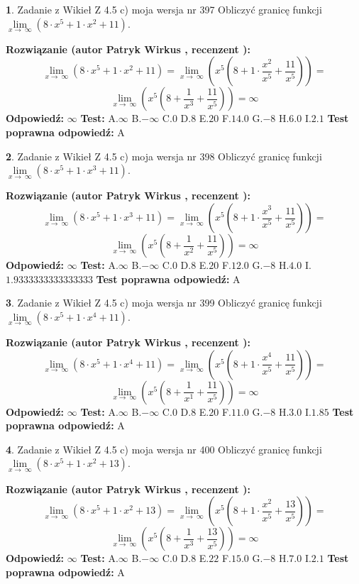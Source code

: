 \documentclass[12pt, a4paper]{article}
\theoremstyle{definition} %
\newtheorem{zad}{}
\newcommand{\zadStart}[1]{\begin{zad}#1\newline}
\newcommand{\zadStop}{\end{zad}}
\newcommand{\rozwStart}[2]{\noindent \textbf{Rozwiązanie (autor #1 , recenzent #2): }\newline}
\newcommand{\rozwStop}{\newline}
\newcommand{\odpStart}{\noindent \textbf{Odpowiedź:}\newline}
\newcommand{\odpStop}{\newline}
\newcommand{\testStart}{\noindent \textbf{Test:}\newline}
\newcommand{\testStop}{\newline}
\newcommand{\kluczStart}{\noindent \textbf{Test poprawna odpowiedź:}\newline}
\newcommand{\kluczStop}{\newline}
\begin{document}
\zadStart{Zadanie z Wikieł Z 4.5 c) moja wersja nr 397}
Obliczyć granicę funkcji  $\lim\limits_{x\to\ \infty}(8 \cdot x^{5}+1 \cdot x^{2}+11)$.
\zadStop
\rozwStart{Patryk Wirkus}{}
$$\lim\limits_{x\to\ \infty}(8 \cdot x^{5}+1 \cdot x^{2}+11) = \lim\limits_{x\to\ \infty}(x^{5}(8 +1 \cdot \frac{x^{2}}{x^{5}}+\frac{11}{x^{5}})) =$$ $$\lim\limits_{x\to\ \infty}(x^{5}(8 +\frac{1}{x^{3}}+\frac{11}{x^{5}})) =\infty$$
\rozwStop
\odpStart
$\infty$
\odpStop
\testStart
A.$\infty$ B.$-\infty$ C.$0$ D.$8$ E.$20$
F.$14.0$ G.$-8$
H.$6.0$
I.$2.1$
\testStop
\kluczStart
A
\kluczStop



\zadStart{Zadanie z Wikieł Z 4.5 c) moja wersja nr 398}
Obliczyć granicę funkcji  $\lim\limits_{x\to\ \infty}(8 \cdot x^{5}+1 \cdot x^{3}+11)$.
\zadStop
\rozwStart{Patryk Wirkus}{}
$$\lim\limits_{x\to\ \infty}(8 \cdot x^{5}+1 \cdot x^{3}+11) = \lim\limits_{x\to\ \infty}(x^{5}(8 +1 \cdot \frac{x^{3}}{x^{5}}+\frac{11}{x^{5}})) =$$ $$\lim\limits_{x\to\ \infty}(x^{5}(8 +\frac{1}{x^{2}}+\frac{11}{x^{5}})) =\infty$$
\rozwStop
\odpStart
$\infty$
\odpStop
\testStart
A.$\infty$ B.$-\infty$ C.$0$ D.$8$ E.$20$
F.$12.0$ G.$-8$
H.$4.0$
I.$1.9333333333333333$
\testStop
\kluczStart
A
\kluczStop



\zadStart{Zadanie z Wikieł Z 4.5 c) moja wersja nr 399}
Obliczyć granicę funkcji  $\lim\limits_{x\to\ \infty}(8 \cdot x^{5}+1 \cdot x^{4}+11)$.
\zadStop
\rozwStart{Patryk Wirkus}{}
$$\lim\limits_{x\to\ \infty}(8 \cdot x^{5}+1 \cdot x^{4}+11) = \lim\limits_{x\to\ \infty}(x^{5}(8 +1 \cdot \frac{x^{4}}{x^{5}}+\frac{11}{x^{5}})) =$$ $$\lim\limits_{x\to\ \infty}(x^{5}(8 +\frac{1}{x^{1}}+\frac{11}{x^{5}})) =\infty$$
\rozwStop
\odpStart
$\infty$
\odpStop
\testStart
A.$\infty$ B.$-\infty$ C.$0$ D.$8$ E.$20$
F.$11.0$ G.$-8$
H.$3.0$
I.$1.85$
\testStop
\kluczStart
A
\kluczStop



\zadStart{Zadanie z Wikieł Z 4.5 c) moja wersja nr 400}
Obliczyć granicę funkcji  $\lim\limits_{x\to\ \infty}(8 \cdot x^{5}+1 \cdot x^{2}+13)$.
\zadStop
\rozwStart{Patryk Wirkus}{}
$$\lim\limits_{x\to\ \infty}(8 \cdot x^{5}+1 \cdot x^{2}+13) = \lim\limits_{x\to\ \infty}(x^{5}(8 +1 \cdot \frac{x^{2}}{x^{5}}+\frac{13}{x^{5}})) =$$ $$\lim\limits_{x\to\ \infty}(x^{5}(8 +\frac{1}{x^{3}}+\frac{13}{x^{5}})) =\infty$$
\rozwStop
\odpStart
$\infty$
\odpStop
\testStart
A.$\infty$ B.$-\infty$ C.$0$ D.$8$ E.$22$
F.$15.0$ G.$-8$
H.$7.0$
I.$2.1$
\testStop
\kluczStart
A
\kluczStop
\end{document}
